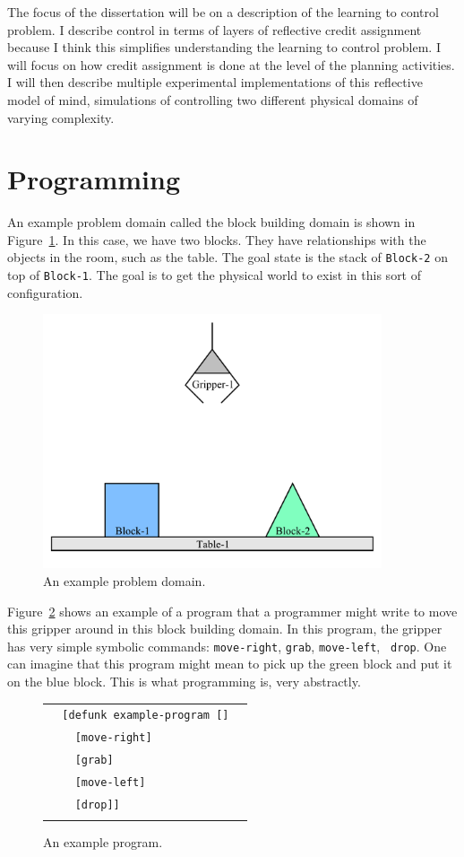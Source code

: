 The focus of the dissertation will be on a description of the learning
to control problem.  I describe control in terms of layers of
reflective credit assignment because I think this simplifies
understanding the learning to control problem.  I will focus on how
credit assignment is done at the level of the planning activities.  I
will then describe multiple experimental implementations of this
reflective model of mind, simulations of controlling two different
physical domains of varying complexity.

\section{Programming}

An example problem domain called the block building domain is shown in
Figure~\ref{figure:example_problem_domain}.  In this case, we have two
blocks.  They have relationships with the objects in the room, such as
the table.  The goal state is the stack of {\tt Block-2} on top of
{\tt Block-1}.  The goal is to get the physical world to exist in this
sort of configuration.
\begin{figure}
\center
\includegraphics[width=10cm]{gfx/blocks_world_example-1}
\caption{An example problem domain.}
\label{figure:example_problem_domain}
\end{figure}

Figure~\ref{figure:example_program} shows an example of a program that
a programmer might write to move this gripper around in this block
building domain.  In this program, the gripper has very simple
symbolic commands: {\tt move-right}, {\tt grab}, {\tt move-left}, {\tt
  drop}.  One can imagine that this program might mean to pick up the
green block and put it on the blue block.  This is what programming
is, very abstractly.
\begin{figure}
\center
\begin{tabular}{l}
\\
  {\tt ~~[defunk example-program []}~~ \\
  {\tt ~~~~[move-right]} ~~\\
  {\tt ~~~~[grab]} ~~\\
  {\tt ~~~~[move-left]} ~~\\
  {\tt ~~~~[drop]]} ~~\\
\\
\end{tabular}
\caption{An example program.}
\label{figure:example_program}
\end{figure}

